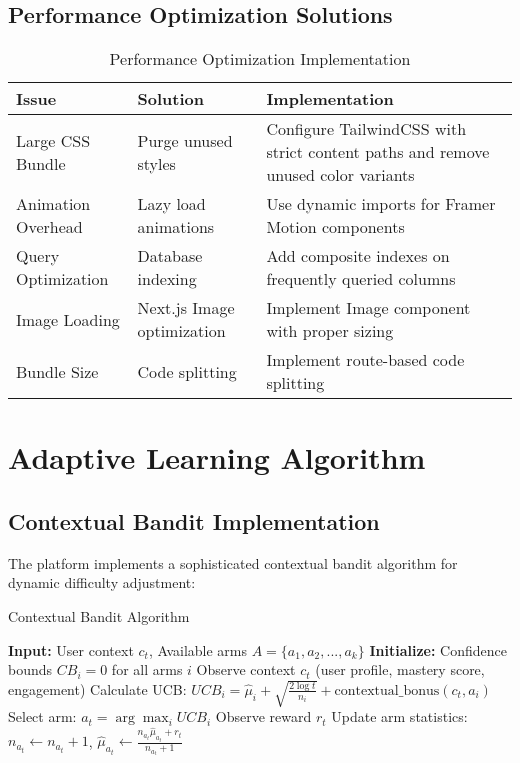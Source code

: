 \documentclass[12pt,a4paper]{article}
\begin{document}
\subsection{Performance Optimization Solutions}

\begin{table}[H]
\centering
\caption{Performance Optimization Implementation}
\begin{tabular}{|p{3cm}|p{4cm}|p{6cm}|}
\hline
\textbf{Issue} & \textbf{Solution} & \textbf{Implementation} \\
\hline
Large CSS Bundle & Purge unused styles & Configure TailwindCSS with strict content paths and remove unused color variants \\
\hline
Animation Overhead & Lazy load animations & Use dynamic imports for Framer Motion components \\
\hline
Query Optimization & Database indexing & Add composite indexes on frequently queried columns \\
\hline
Image Loading & Next.js Image optimization & Implement Image component with proper sizing \\
\hline
Bundle Size & Code splitting & Implement route-based code splitting \\
\hline
\end{tabular}
\label{tab:performance-optimization}
\end{table}

\section{Adaptive Learning Algorithm}

\subsection{Contextual Bandit Implementation}

The platform implements a sophisticated contextual bandit algorithm for dynamic difficulty adjustment:

\begin{algorithm}[H]
\caption{Contextual Bandit Algorithm}
\begin{algorithmic}[1]
\STATE \textbf{Input:} User context $c_t$, Available arms $A = \{a_1, a_2, ..., a_k\}$
\STATE \textbf{Initialize:} Confidence bounds $CB_i = 0$ for all arms $i$
    \STATE Observe context $c_t$ (user profile, mastery score, engagement)
        \STATE Calculate UCB: $UCB_i = \hat{\mu}_i + \sqrt{\frac{2\log t}{n_i}} + \text{contextual\_bonus}(c_t, a_i)$
    \ENDFOR
    \STATE Select arm: $a_t = \arg\max_i UCB_i$
    \STATE Observe reward $r_t$
    \STATE Update arm statistics: $n_{a_t} \leftarrow n_{a_t} + 1$, $\hat{\mu}_{a_t} \leftarrow \frac{n_{a_t}\hat{\mu}_{a_t} + r_t}{n_{a_t} + 1}$
\ENDFOR
\end{algorithmic}
\end{algorithm}
\end{document}
